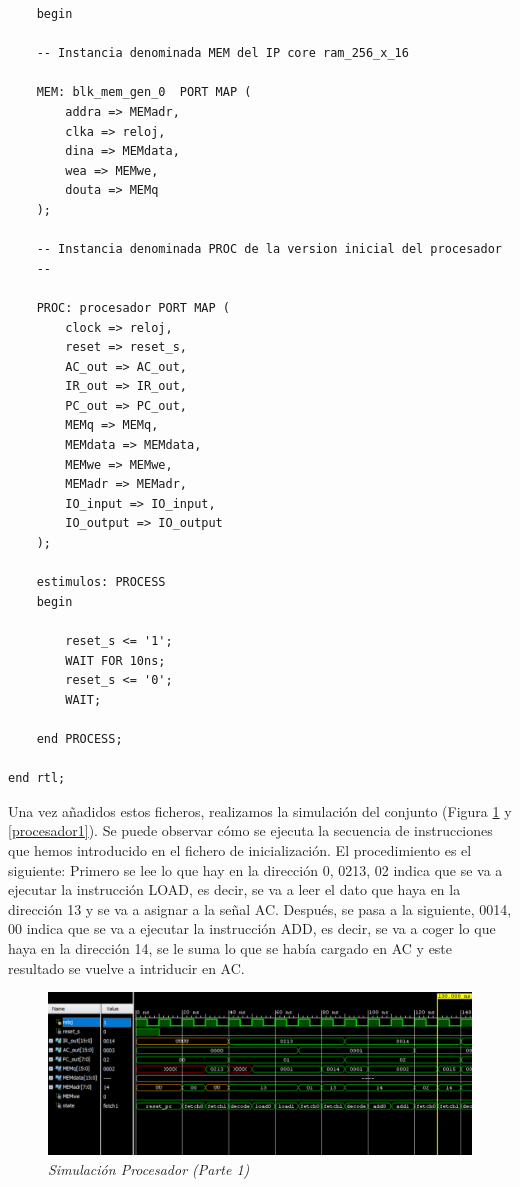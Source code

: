 \begin{lstlisting}
	begin
	
	-- Instancia denominada MEM del IP core ram_256_x_16
	
	MEM: blk_mem_gen_0	PORT MAP (
		addra => MEMadr,
		clka => reloj,
		dina => MEMdata,
		wea => MEMwe,
		douta => MEMq
	);

	-- Instancia denominada PROC de la version inicial del procesador
	--	
	
	PROC: procesador PORT MAP (
		clock => reloj, 
		reset => reset_s,
		AC_out => AC_out,
		IR_out => IR_out,
		PC_out => PC_out,
		MEMq => MEMq,
		MEMdata => MEMdata,
		MEMwe => MEMwe,
		MEMadr => MEMadr,
		IO_input => IO_input,
		IO_output => IO_output
	);

    estimulos: PROCESS 
    begin
    
        reset_s <= '1';
        WAIT FOR 10ns;
        reset_s <= '0';
        WAIT;
    
    end PROCESS;
	
end rtl;
\end{lstlisting}

Una vez añadidos estos ficheros, realizamos la simulación del conjunto (Figura \ref{procesador} y \ref{procesador1}). Se puede observar cómo se 
ejecuta la secuencia de instrucciones que hemos introducido en el fichero de inicialización. El procedimiento es el siguiente: 
Primero se lee lo que hay en la dirección 0, 0213, 02 indica que se va a ejecutar la instrucción LOAD, es decir, se va a leer el 
dato que haya en la dirección 13 y se va a asignar a la señal AC. Después, se pasa a la siguiente, 0014, 00 indica que se va 
a ejecutar la instrucción ADD, es decir, se va a coger lo que haya en la dirección 14, se le suma lo que se había cargado en AC y 
este resultado se vuelve a intriducir en AC. 

\begin{figure}[H]
    \centering
    \includegraphics[width = 1\textwidth]{imagenes/procesador.png}
    \caption{\textit{Simulación Procesador (Parte 1)}}\label{procesador}
\end{figure}

